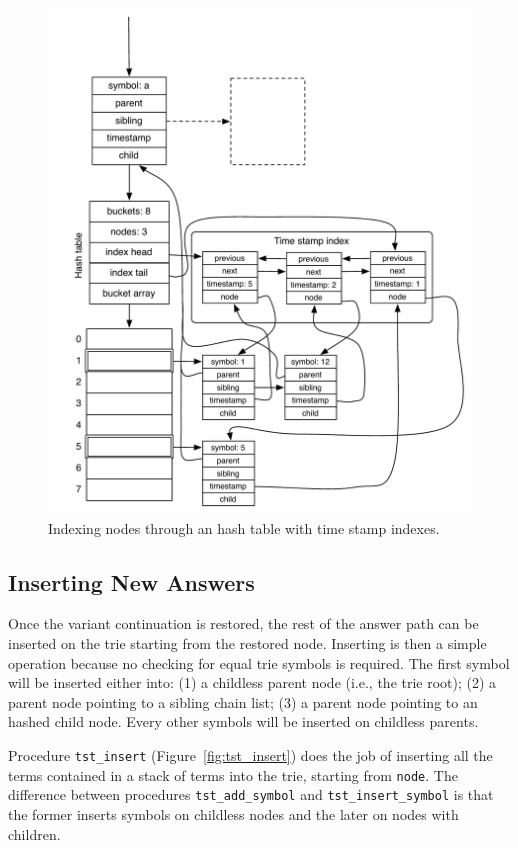 \begin{figure}[ht]
  \centering
    \includegraphics[scale=0.6]{hash_table_tst.pdf}
  \caption{Indexing nodes through an hash table with time stamp indexes.}
  \label{fig:hash_table_tst}
\end{figure}

\subsection{Inserting New Answers}

Once the variant continuation is restored, the rest of the answer path can be inserted on the trie starting
from the restored node. Inserting is then a simple operation because no checking for equal trie symbols is required.
The first symbol will be inserted either into: (1) a childless parent node (i.e., the trie root);
(2) a parent node pointing to a sibling chain list; (3) a parent node pointing to an hashed child node.
Every other symbols will be inserted on childless parents.

Procedure \texttt{tst\_insert} (Figure~\ref{fig:tst_insert}) does the job of inserting
all the terms contained in a stack of terms into the trie, starting from \texttt{node}.
The difference between procedures \texttt{tst\_add\_symbol} and \texttt{tst\_insert\_symbol}
is that the former inserts symbols on childless nodes and the later on nodes with children.

